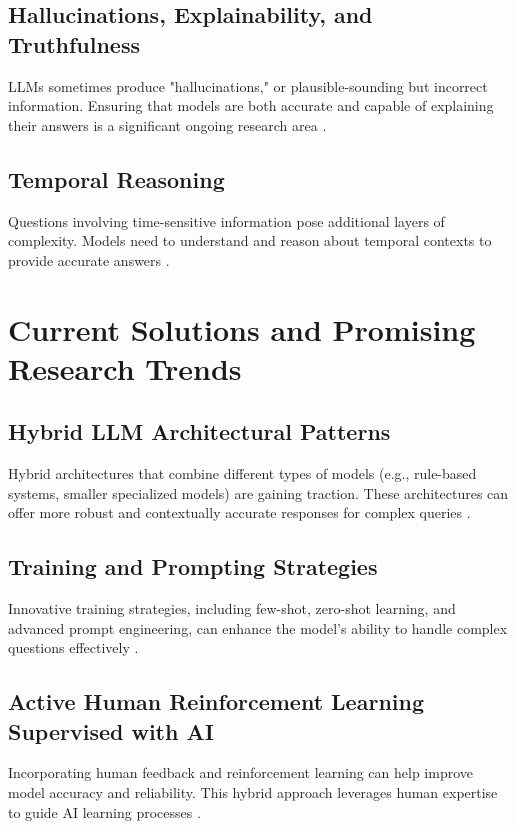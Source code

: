 \documentclass{article}
\begin{document}
\subsection{Hallucinations, Explainability, and Truthfulness}
LLMs sometimes produce "hallucinations," or plausible-sounding but incorrect information. Ensuring that models are both accurate and capable of explaining their answers is a significant ongoing research area \cite{maynez2020faithfulness}.

\subsection{Temporal Reasoning}
Questions involving time-sensitive information pose additional layers of complexity. Models need to understand and reason about temporal contexts to provide accurate answers \cite{zhou2020liquid}.

\section{Current Solutions and Promising Research Trends}
\label{sec:solutions}

\subsection{Hybrid LLM Architectural Patterns}
Hybrid architectures that combine different types of models (e.g., rule-based systems, smaller specialized models) are gaining traction. These architectures can offer more robust and contextually accurate responses for complex queries \cite{biasse2022hybrid}.

\subsection{Training and Prompting Strategies}
Innovative training strategies, including few-shot, zero-shot learning, and advanced prompt engineering, can enhance the model's ability to handle complex questions effectively \cite{rae2021scaling}.

\subsection{Active Human Reinforcement Learning Supervised with AI}
Incorporating human feedback and reinforcement learning can help improve model accuracy and reliability. This hybrid approach leverages human expertise to guide AI learning processes \cite{christiano2017deep}.
\end{document}
